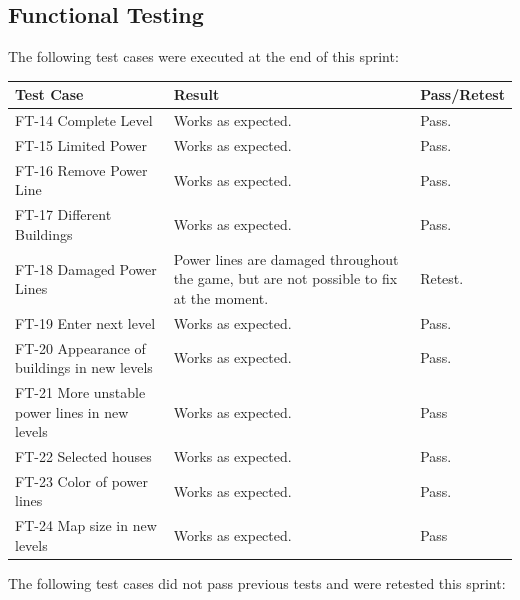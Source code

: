 \subsection{Functional Testing}

	The following test cases were executed at the end of this sprint:


	\begin{tabular}{| p{3cm} | p{7cm} | p{2cm} |}
		\hline
		\rowcolor{lightgray}
		{\bf Test Case} & {\bf Result} & {\bf Pass/Retest} \\ \hline

	  	FT-14 Complete Level & Works as expected. & Pass. \\ \hline
	  	
	  	FT-15 Limited Power & Works as expected. & Pass. \\ \hline
	  	
	  	FT-16 Remove Power Line & Works as expected. & Pass. \\ \hline
	  		  	
	  	FT-17 Different Buildings & Works as expected. & Pass. \\ \hline

	  	FT-18 Damaged Power Lines & Power lines are damaged throughout the game, but are not possible 
	  	to fix at the moment. & Retest. \\ \hline
	  	
	  	FT-19 Enter next level & Works as expected. & Pass. \\ \hline

	  	FT-20 Appearance of buildings in new levels & Works as expected. & Pass. \\ \hline

	  	FT-21 More unstable power lines in new levels & Works as expected. & Pass \\ \hline

	  	FT-22 Selected houses & Works as expected. & Pass. \\ \hline

	  	FT-23 Color of power lines & Works as expected. & Pass. \\ \hline

	  	FT-24 Map size in new levels & Works as expected. & Pass \\ \hline

	\end{tabular}

	The following test cases did not pass previous tests and were retested this sprint:

